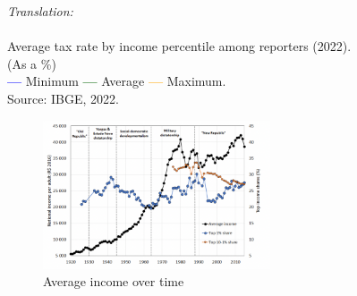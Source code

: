 \documentclass[a4paper, 12pt]{article}
\begin{document}
{\Large{\textit{Translation:}}}
\\
\\
Average tax rate by income percentile among reporters (2022).
\\
(As a \%)
\\
\textcolor{blue}{\textbf{---}} Minimum \textcolor{darkgreen}{\textbf{---}} Average \textcolor{orange}{\textbf{---}} Maximum.
\\
Source: IBGE, 2022.
\\
\begin{figure}[H]
    \centering
    \includegraphics[width=0.6\textwidth]{oneperc.png}
    \caption{Average income over time}
    \label{tab:Figure 2}
\end{figure}
\end{document}
